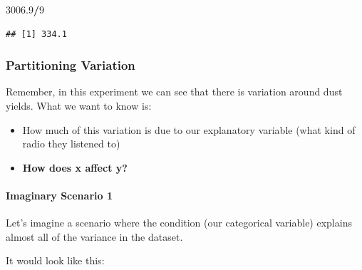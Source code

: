 \documentclass[
]{book}
\newenvironment{Shaded}{\begin{snugshade}}{\end{snugshade}}
\newcommand{\DecValTok}[1]{\textcolor[rgb]{0.00,0.00,0.81}{#1}}
\newcommand{\FloatTok}[1]{\textcolor[rgb]{0.00,0.00,0.81}{#1}}
\newcommand{\OperatorTok}[1]{\textcolor[rgb]{0.81,0.36,0.00}{\textbf{#1}}}
\let\oldparagraph\paragraph
\renewcommand{\paragraph}[1]{\oldparagraph{#1}\mbox{}}
\begin{document}
\begin{Shaded}
\begin{Highlighting}[]
\FloatTok{3006.9}\OperatorTok{/}\DecValTok{9}
\end{Highlighting}
\end{Shaded}

\begin{verbatim}
## [1] 334.1
\end{verbatim}

\hypertarget{partitioning-variation}{%
\subsubsection{Partitioning Variation}\label{partitioning-variation}}

Remember, in this experiment we can see that there is variation around dust yields. What we want to know is:

\begin{itemize}
\item
  How much of this variation is due to our explanatory variable (what kind of radio they listened to)
\item
  \textbf{How does x affect y?}
\end{itemize}

\hypertarget{imaginary-scenario-1}{%
\paragraph{Imaginary Scenario 1}\label{imaginary-scenario-1}}

Let's imagine a scenario where the condition (our categorical variable) explains almost all of the variance in the dataset.

It would look like this:
\end{document}
